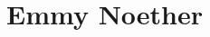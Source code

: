 \documentclass[../../../include/open-logic-chapter]{subfiles}
\begin{document}
\chapter{Emmy Noether}


\OLEndChapterHook
\end{document}
